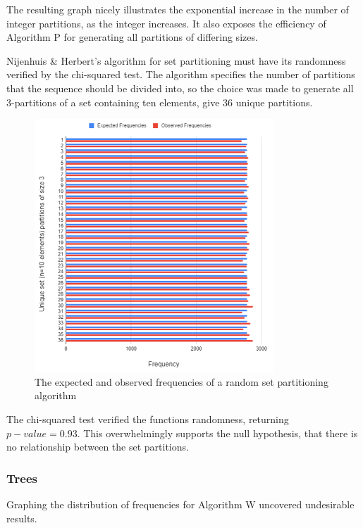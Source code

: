 \documentclass[12pt]{article}
\begin{document}
The resulting graph nicely illustrates the exponential increase in the number of integer partitions, as the integer increases. It also exposes the efficiency of Algorithm P for generating all partitions of differing sizes.

Nijenhuis \& Herbert's algorithm for set partitioning \cite{rand_set_part} must have its randomness verified by the chi-squared test. The algorithm specifies the number of partitions that the sequence should be divided into, so the choice was made to generate all 3-partitions of a set containing ten elements, give 36 unique partitions.

\pagebreak

\begin{figure}[h]
\centering
\includegraphics[width=0.8\textwidth]{images/set_part_freq.PNG}
\caption{The expected and observed frequencies of a random set partitioning algorithm \cite{rand_set_part}}
\end{figure}

The chi-squared test verified the functions randomness, returning \(p-value=0.93\). This overwhelmingly supports the null hypothesis, that there is no relationship between the set partitions.

\subsubsection{Trees}
Graphing the distribution of frequencies for Algorithm W \cite{tree_W} uncovered undesirable results.
\end{document}
